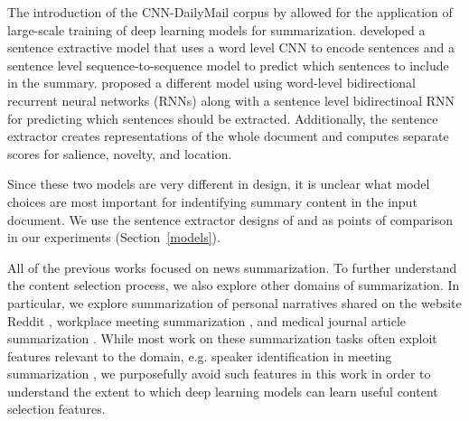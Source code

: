 The introduction of the CNN-DailyMail corpus by \cite{nips15_hermann}
allowed for the application of large-scale training of deep learning models for summarization.
\citet{cheng2016neural} %
developed a sentence extractive
model that uses a word level 
CNN to encode 
sentences and a sentence level sequence-to-sequence model to predict 
which sentences to include in the summary. \citet{nallapati2017summarunner}
proposed a different model using word-level bidirectional recurrent neural 
networks (RNNs) along with a sentence level bidirectinoal RNN for 
predicting which sentences should be extracted. 
Additionally, the sentence
extractor creates representations of the whole document and computes 
separate scores for salience, novelty, and location.

Since these two models are very different in design, it is unclear 
what model choices are most important for indentifying summary content 
in the input document. We use the sentence extractor designs of 
\citep{cheng2016neural} and \citep{nallapati2017summarunner} as points of 
comparison in our experiments 
(Section~\ref{models}).

All of the previous works 
focused on news summarization. To further
understand the content selection process, we also explore other domains 
of summarization. In particular, we explore 
summarization of personal narratives shared
on the website Reddit \cite{ouyang2017crowd}, workplace meeting summarization
\cite{carletta2005ami}, and medical journal article summarization 
\cite{mishra2014text}. While most work on these summarization tasks
 often exploit 
features relevant
to the domain, e.g. speaker identification in meeting summarization \cite{gillick2009global},
we purposefully avoid such features in this work in order to understand 
the extent to which deep learning models can learn useful content 
selection features.


